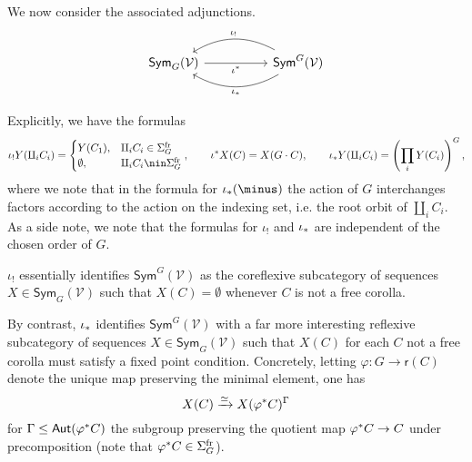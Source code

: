 \documentclass[a4paper,10pt]{article}%
\begin{document}
We now consider the associated adjunctions.
\begin{equation}\label{TWOADJOINTS EQ}
\begin{tikzcd}[column sep =5em]
	\mathsf{Sym}_G(\mathcal{V}) \ar{r}[swap]{\iota^{\**}} 
	&
	\mathsf{Sym}^G(\mathcal{V})
	\ar[bend right]{l}[swap,midway]{\iota_{!}}
	\ar[bend left]{l}{\iota_{\**}}
\end{tikzcd}
\end{equation}


Explicitly, we have the formulas
\[
	\iota_!Y(\amalg_i C_i)=
	\begin{cases}
	Y(C_1), & \amalg_i C_i \in \Sigma_G^{\text{fr}} \\
	\emptyset, & \amalg_i C_i \nin \Sigma_G^{\text{fr}}
	\end{cases},
\qquad
	\iota^{\**}X (C) = X(G \cdot C),
\qquad
	\iota_{\**}Y (\amalg_i C_i)=
	\left(\prod_i Y(C_i)\right)^G,
\]
where we note that in the formula for $\iota_{\**}(\minus)$
the action of $G$ interchanges factors according to the action on the indexing set, i.e. the root orbit of $\amalg_i C_i$.
As a side note, we note that the formulas for $\iota_!$ and $\iota_{\**}$ are independent of the chosen order of $G$.

\begin{remark}\label{REFLCOREFL REM}
	$\iota_!$ essentially identifies 
	$\mathsf{Sym}^G(\mathcal{V})$ as the coreflexive subcategory of sequences 
	$X \in \mathsf{Sym}_G(\mathcal{V})$ such that $X(C)=\emptyset$ whenever $C$ is not a free corolla.

By contrast, $\iota_{\**}$ identifies 
$\mathsf{Sym}^G(\mathcal{V})$ with a far more interesting reflexive subcategory of sequences 
$X \in \mathsf{Sym}_G(\mathcal{V})$ 
such that $X(C)$ for each $C$ not a free corolla must satisfy a fixed point condition. Concretely, letting 
$\varphi \colon G \to \mathsf{r}(C)$
denote the unique map preserving the minimal element, one has
\[X(C) \xrightarrow{\simeq} X(\varphi^{\**}C)^{\Gamma}\]
for 
$\Gamma \leq \mathsf{Aut}(\varphi^{\**}C)$
the subgroup preserving the quotient map
$\varphi^{\**}C \to C$
under precomposition (note that $\varphi^{\**}C \in \Sigma_G^{\text{fr}}$).
\end{remark}
\end{document}
